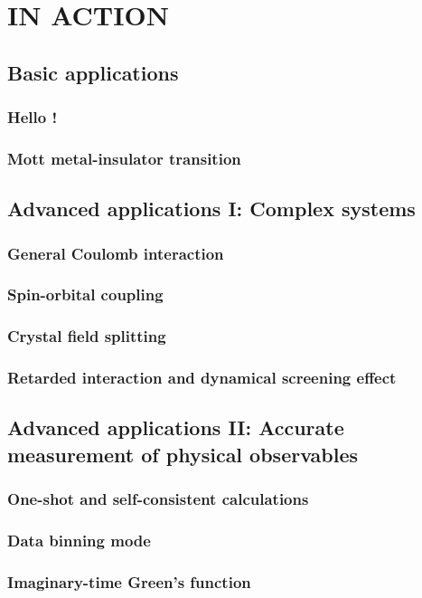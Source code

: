 \chapter{{\iqist} IN ACTION}
\section{Basic applications}
\subsection{Hello {\iqist}!}
\subsection{Mott metal-insulator transition}
\section{Advanced applications I: Complex systems}
\subsection{General Coulomb interaction}
\subsection{Spin-orbital coupling}
\subsection{Crystal field splitting}
\subsection{Retarded interaction and dynamical screening effect}
\section{Advanced applications II: Accurate measurement of physical observables}
\subsection{One-shot and self-consistent calculations}
\subsection{Data binning mode}
\subsection{Imaginary-time Green's function}

